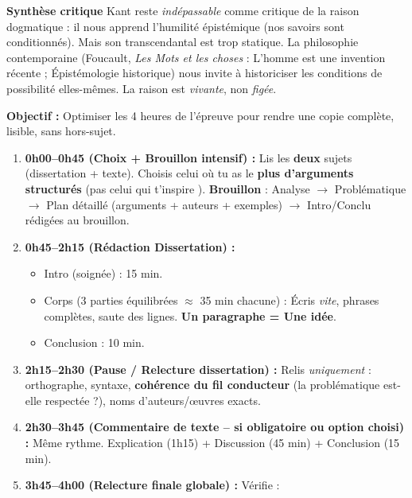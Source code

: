 \documentclass[11pt]{article}
\newcommand{\cle}[1]{{\popxbold\color{popdark}#1}}
\begin{document}
\begin{exoresolu}
    \textbf{Synthèse critique}
    Kant reste \emph{indépassable} comme \cle{critique de la raison dogmatique} : il nous apprend l'humilité épistémique (nos savoirs sont conditionnés). Mais son \cle{transcendantal} est trop statique. La philosophie contemporaine (Foucault, \emph{Les Mots et les choses} : \guillemotleft L'homme est une invention récente \guillemotright ; Épistémologie historique) nous invite à historiciser les \guillemotleft conditions de possibilité \guillemotright elles-mêmes. La raison est \emph{vivante}, non \emph{figée}.
\end{exoresolu}

\begin{methode}
    \textbf{Objectif :} Optimiser les 4 heures de l'épreuve pour rendre une copie complète, lisible, sans hors-sujet.
    \begin{enumerate}
        \item \textbf{0h00--0h45 (Choix + Brouillon intensif) :} Lis les \textbf{deux} sujets (dissertation + texte). Choisis celui où tu as le \textbf{plus d'arguments structurés} (pas celui qui t'\guillemotleft inspire \guillemotright). \textbf{Brouillon} : Analyse $\rightarrow$ Problématique $\rightarrow$ Plan détaillé (arguments + auteurs + exemples) $\rightarrow$ Intro/Conclu rédigées au brouillon.
        \item \textbf{0h45--2h15 (Rédaction Dissertation) :} \begin{itemize}
            \item Intro (soignée) : 15 min.
            \item Corps (3 parties équilibrées $\approx$ 35 min chacune) : Écris \emph{vite}, phrases complètes, saute des lignes. \textbf{Un paragraphe = Une idée}.
            \item Conclusion : 10 min.
        \end{itemize}
        \item \textbf{2h15--2h30 (Pause / Relecture dissertation) :} Relis \emph{uniquement} : orthographe, syntaxe, \textbf{cohérence du fil conducteur} (la problématique est-elle respectée ?), noms d'auteurs/œuvres exacts.
        \item \textbf{2h30--3h45 (Commentaire de texte -- si obligatoire ou option choisi) :} Même rythme. Explication (1h15) + Discussion (45 min) + Conclusion (15 min).
        \item \textbf{3h45--4h00 (Relecture finale globale) :} Vérifie : \begin{itemize}

\end{itemize}
\end{enumerate}
\end{methode}
\end{document}
